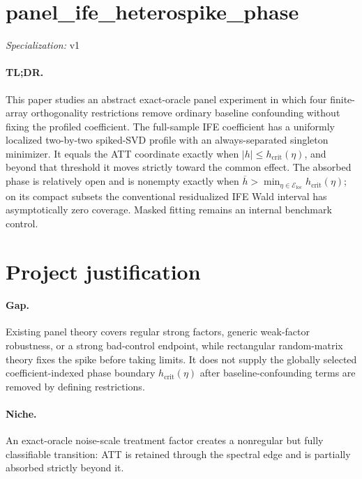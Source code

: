 \documentclass{article}
\begin{document}
\sloppy

\section*{panel\_\allowbreak{}ife\_\allowbreak{}heterospike\_\allowbreak{}phase}

\noindent\textit{Specialization:} v1\par

\paragraph{TL;DR.} This paper studies an abstract exact-oracle panel experiment in which four finite-array orthogonality restrictions remove ordinary baseline confounding without fixing the profiled coefficient.  The full-sample IFE coefficient has a uniformly localized two-by-two spiked-SVD profile with an always-separated singleton minimizer.  It equals the ATT coordinate exactly when \(|h|\le h_{\mathrm{crit}}(\eta)\), and beyond that threshold it moves strictly toward the common effect.  The absorbed phase is relatively open and is nonempty exactly when \(\overline h>\min_{\eta\in\mathcal E_{\mathrm{loc}}}h_{\mathrm{crit}}(\eta)\); on its compact subsets the conventional residualized IFE Wald interval has asymptotically zero coverage.  Masked fitting remains an internal benchmark control.

\section{Project justification}

\paragraph{Gap.} Existing panel theory covers regular strong factors, generic weak-factor robustness, or a strong bad-control endpoint, while rectangular random-matrix theory fixes the spike before taking limits.  It does not supply the globally selected coefficient-indexed phase boundary \(h_{\mathrm{crit}}(\eta)\) after baseline-confounding terms are removed by defining restrictions.

\paragraph{Niche.} An exact-oracle noise-scale treatment factor creates a nonregular but fully classifiable transition: ATT is retained through the spectral edge and is partially absorbed strictly beyond it.
\end{document}
